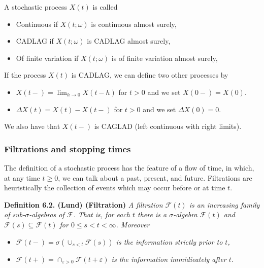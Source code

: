 \documentclass[a4paper,10pt,openany]{book}
\providecommand{\tightlist}{%
 \setlength{\itemsep}{0pt}\setlength{\parskip}{0pt}}
\begin{document}
A stochastic process \(X(t)\) is called

\begin{itemize}
\tightlist
\item
  Continuous if \(X(t;\omega)\) is continuous almost surely,
\item
  CADLAG if \(X(t;\omega)\) is CADLAG almost surely,
\item
  Of finite variation if \(X(t;\omega)\) is of finite variation almost surely,
\end{itemize}

If the process \(X(t)\) is CADLAG, we can define two other processes by

\begin{itemize}
\tightlist
\item
  \(X(t-)=\lim_{h\to 0}X(t-h)\) for \(t>0\) and we set \(X(0-)=X(0)\).
\item
  \(\Delta X(t)=X(t)-X(t-)\) for \(t>0\) and we set \(\Delta X(0)=0\).
\end{itemize}

We also have that \(X(t-)\) is CAGLAD (left continuous with right limits).

\hypertarget{filtrations-and-stopping-times}{%
\subsubsection{Filtrations and stopping times}\label{filtrations-and-stopping-times}}

The definition of a stochastic process has the feature of a flow of time, in which, at any time \(t \ge 0\), we can talk about a past, present, and future. Filtrations are heuristically the collection of events which may occur before or at time \(t\).

\textbf{Definition 6.2. (Lund) (Filtration)} \emph{A filtration \(\mathcal F(t)\) is an increasing family of sub-\(\sigma\)-algebras of \(\mathcal F\). That is, for each \(t\) there is a \(\sigma\)-algebra \(\mathcal F(t)\) and \(\mathcal F(s)\subseteq \mathcal F(t)\) for \(0\le s<t<\infty\). Moreover}

\begin{itemize}
\tightlist
\item
  \emph{\(\mathcal F(t-)=\sigma(\cup_{s<t} \mathcal F(s))\) is the information strictly prior to \(t\),}
\item
  \emph{\(\mathcal F(t+)=\cap_{\varepsilon >0}\mathcal F(t+\varepsilon)\) is the information immidieately after \(t\).}
\end{itemize}
\end{document}
